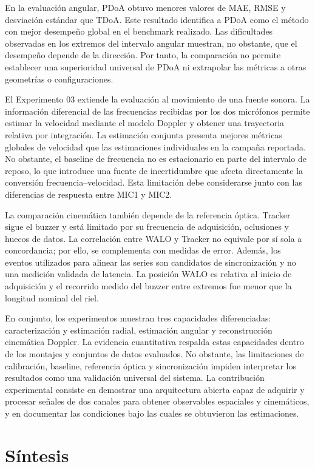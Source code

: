 En la evaluación angular, PDoA obtuvo menores valores de
MAE, RMSE y desviación estándar que TDoA. Este resultado
identifica a PDoA como el método con mejor desempeño global
en el benchmark realizado. Las dificultades observadas
en los extremos del intervalo angular muestran, no obstante,
que el desempeño depende de la dirección. Por tanto, la
comparación no permite establecer una superioridad
universal de PDoA ni extrapolar las métricas a otras
geometrías o configuraciones.

El Experimento 03 extiende la evaluación al movimiento
de una fuente sonora. La información diferencial de las
frecuencias recibidas por los dos micrófonos permite
estimar la velocidad mediante el modelo Doppler y obtener
una trayectoria relativa por integración. La estimación
conjunta presenta mejores métricas globales de velocidad
que las estimaciones individuales en la campaña reportada.
No obstante, el baseline de frecuencia no es estacionario
en parte del intervalo de reposo, lo que introduce una
fuente de incertidumbre que afecta directamente la
conversión frecuencia--velocidad. Esta limitación debe
considerarse junto con las diferencias de respuesta entre
MIC1 y MIC2.

La comparación cinemática también depende de la referencia
óptica. Tracker sigue el buzzer y está limitado por su
frecuencia de adquisición, oclusiones y huecos de datos.
La correlación entre WALO y Tracker no equivale por sí
sola a concordancia; por ello, se complementa con medidas
de error. Además, los eventos utilizados para alinear las
series son candidatos de sincronización y no una medición
validada de latencia. La posición WALO es relativa al
inicio de adquisición y el recorrido medido del buzzer
entre extremos fue menor que la longitud nominal del riel.

En conjunto, los experimentos muestran tres capacidades
diferenciadas: caracterización y estimación radial,
estimación angular y reconstrucción cinemática Doppler.
La evidencia cuantitativa respalda estas capacidades
dentro de los montajes y conjuntos de datos evaluados.
No obstante, las limitaciones de calibración, baseline,
referencia óptica y sincronización impiden interpretar
los resultados como una validación universal del sistema.
La contribución experimental consiste en demostrar una
arquitectura abierta capaz de adquirir y procesar señales
de dos canales para obtener observables espaciales y
cinemáticos, y en documentar las condiciones bajo las
cuales se obtuvieron las estimaciones.

\section{Síntesis}
\label{sec:sintesis_cap4}

